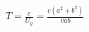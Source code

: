 \documentclass[border=2.5pt]{standalone}
\begin{document}
$\displaystyle \boxed{T=\frac c{U_y}=\frac{c(a^2+b^2)}{vab}}$
\end{document}
